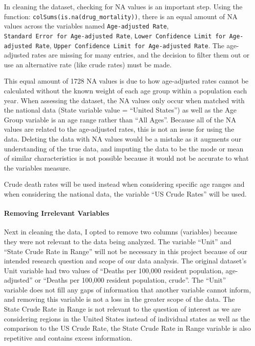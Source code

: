 \documentclass[
]{article}
\begin{document}
In cleaning the dataset, checking for NA values is an important step.
Using the function: \texttt{colSums(is.na(drug\_mortality))}, there is
an equal amount of NA values across the variables named
\texttt{Age-adjusted\ Rate},
\texttt{Standard\ Error\ for\ Age-adjusted\ Rate},
\texttt{Lower\ Confidence\ Limit\ for\ Age-adjusted\ Rate},
\texttt{Upper\ Confidence\ Limit\ for\ Age-adjusted\ Rate}. The
age-adjusted rates are missing for many entries, and the decision to
filter them out or use an alternative rate (like crude rates) must be
made.

This equal amount of 1728 NA values is due to how age-adjusted rates
cannot be calculated without the known weight of each age group within a
population each year. When assessing the dataset, the NA values only
occur when matched with the national data (State variable value =
``United States'') as well as the Age Group variable is an age range
rather than ``All Ages''. Because all of the NA values are related to
the age-adjusted rates, this is not an issue for using the data.
Deleting the data with NA values would be a mistake as it augments our
understanding of the true data, and imputing the data to be the mode or
mean of similar characteristics is not possible because it would not be
accurate to what the variables measure.

Crude death rates will be used instead when considering specific age
ranges and when considering the national data, the variable ``US Crude
Rates'' will be used.

\paragraph{Removing Irrelevant
Variables}\label{removing-irrelevant-variables}

Next in cleaning the data, I opted to remove two columns (variables)
because they were not relevant to the data being analyzed. The variable
``Unit'' and ``State Crude Rate in Range'' will not be necessary in this
project because of our intended research question and scope of our data
analysis. The original dataset's Unit variable had two values of
``Deaths per 100,000 resident population, age-adjusted'' or ``Deaths per
100,000 resident population, crude''. The ``Unit'' variable does not
fill any gaps of information that another variable cannot inform, and
removing this variable is not a loss in the greater scope of the data.
The State Crude Rate in Range is not relevant to the question of
interest as we are considering regions in the United States instead of
individual states as well as the comparison to the US Crude Rate, the
State Crude Rate in Range variable is also repetitive and contains
excess information.
\end{document}
